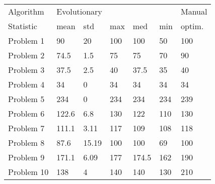 \begin{tabular}{lllllll}
\toprule
Algorithm & \multicolumn{5}{l}{Evolutionary} & Manual \\
Statistic &         mean &    std &  max &    med &  min & optim. \\
\midrule
Problem 1  &           90 &     20 &  100 &    100 &   50 &    100 \\
Problem 2  &         74.5 &    1.5 &   75 &     75 &   70 &     90 \\
Problem 3  &         37.5 &    2.5 &   40 &   37.5 &   35 &     40 \\
Problem 4  &           34 &      0 &   34 &     34 &   34 &     34 \\
Problem 5  &          234 &      0 &  234 &    234 &  234 &    239 \\
Problem 6  &        122.6 &    6.8 &  130 &    122 &  110 &    130 \\
Problem 7  &        111.1 &   3.11 &  117 &    109 &  108 &    118 \\
Problem 8  &         87.6 &  15.19 &  100 &    100 &   69 &    100 \\
Problem 9  &        171.1 &   6.09 &  177 &  174.5 &  162 &    190 \\
Problem 10 &          138 &      4 &  140 &    140 &  130 &    210 \\
\bottomrule
\end{tabular}
